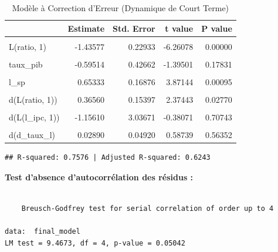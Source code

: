 \documentclass[
]{article}
\begin{document}
\begin{longtable}[t]{lrrrr}
\caption{\label{tab:unnamed-chunk-52}Modèle à Correction d'Erreur (Dynamique de Court Terme)}\\
\toprule
 & Estimate & Std. Error & t value & P value\\
\midrule
\cellcolor{gray!10}{(Intercept)} & \cellcolor{gray!10}{5.98835} & \cellcolor{gray!10}{1.65040} & \cellcolor{gray!10}{3.62843} & \cellcolor{gray!10}{0.00167}\\
L(ratio, 1) & -1.43577 & 0.22933 & -6.26078 & 0.00000\\
\cellcolor{gray!10}{L(l\_ipc, 1)} & \cellcolor{gray!10}{-0.71122} & \cellcolor{gray!10}{0.51071} & \cellcolor{gray!10}{-1.39260} & \cellcolor{gray!10}{0.17903}\\
taux\_pib & -0.59514 & 0.42662 & -1.39501 & 0.17831\\
\cellcolor{gray!10}{L(d\_taux\_l, 1)} & \cellcolor{gray!10}{0.11224} & \cellcolor{gray!10}{0.06702} & \cellcolor{gray!10}{1.67463} & \cellcolor{gray!10}{0.10957}\\
\addlinespace
l\_sp & 0.65333 & 0.16876 & 3.87144 & 0.00095\\
\cellcolor{gray!10}{l\_cac} & \cellcolor{gray!10}{-0.55268} & \cellcolor{gray!10}{0.26657} & \cellcolor{gray!10}{-2.07330} & \cellcolor{gray!10}{0.05128}\\
d(L(ratio, 1)) & 0.36560 & 0.15397 & 2.37443 & 0.02770\\
\cellcolor{gray!10}{d(l\_ipc)} & \cellcolor{gray!10}{6.96610} & \cellcolor{gray!10}{3.24159} & \cellcolor{gray!10}{2.14898} & \cellcolor{gray!10}{0.04406}\\
d(L(l\_ipc, 1)) & -1.15610 & 3.03671 & -0.38071 & 0.70743\\
\addlinespace
\cellcolor{gray!10}{d(L(l\_ipc, 2))} & \cellcolor{gray!10}{13.40692} & \cellcolor{gray!10}{3.48527} & \cellcolor{gray!10}{3.84673} & \cellcolor{gray!10}{0.00101}\\
d(d\_taux\_l) & 0.02890 & 0.04920 & 0.58739 & 0.56352\\
\bottomrule
\end{longtable}

\begin{verbatim}
## R-squared: 0.7576 | Adjusted R-squared: 0.6243
\end{verbatim}

\textbf{Test d'absence d'autocorrélation des résidus :}

\begin{verbatim}

    Breusch-Godfrey test for serial correlation of order up to 4

data:  final_model
LM test = 9.4673, df = 4, p-value = 0.05042
\end{verbatim}
\end{document}
